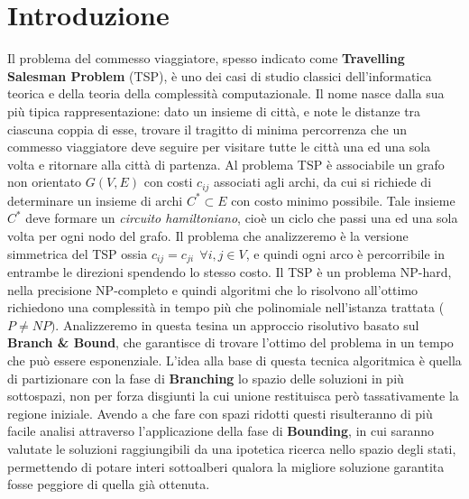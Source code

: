 \documentclass[
	article,			%
	12pt,				%
	oneside,			%
	a4paper,			%
	english,			%
	italian,				%
	sumario=tradicional,
	]{abntex2}
\begin{document}
\section{Introduzione}
Il problema del commesso viaggiatore, spesso indicato come \textbf{Travelling Salesman Problem} (TSP), è uno dei casi di studio classici dell'informatica teorica e della teoria della complessità computazionale. Il nome nasce dalla sua più tipica rappresentazione: dato un insieme di città, e note le distanze tra ciascuna coppia di esse, trovare il tragitto di minima percorrenza che un commesso viaggiatore deve seguire per visitare tutte le città una ed una sola volta e ritornare alla città di partenza. Al problema TSP è associabile un grafo non orientato $G(V,E)$ con costi $c_{ij}$ associati agli archi, da cui si richiede di determinare un insieme di archi $C^* \subset E$ con costo minimo possibile. Tale insieme $C^*$ deve formare un \textit{circuito hamiltoniano}, cioè un ciclo che passi una ed una sola volta per ogni nodo del grafo. Il problema che analizzeremo è la versione simmetrica del TSP ossia $c_{ij} = c_{ji} \:\: \forall i,j \in V$, e quindi ogni arco è percorribile in entrambe le direzioni spendendo lo stesso costo.
\newline
Il TSP è un problema NP-hard, nella precisione NP-completo e quindi algoritmi che lo risolvono all'ottimo richiedono una complessità in tempo più che polinomiale nell'istanza trattata ($P \neq NP)$.
\newline
Analizzeremo in questa tesina un approccio risolutivo basato sul \textbf{Branch \& Bound}, che garantisce di trovare l'ottimo del problema in un tempo che può essere esponenziale. L'idea alla base di questa tecnica algoritmica è quella di partizionare con la fase di \textbf{Branching} lo spazio delle soluzioni in più sottospazi, non per forza disgiunti la cui unione restituisca però tassativamente la regione iniziale. Avendo a che fare con spazi ridotti questi risulteranno di più facile analisi attraverso l'applicazione della fase di \textbf{Bounding}, in cui saranno valutate le soluzioni raggiungibili da una ipotetica ricerca nello spazio degli stati, permettendo di potare interi sottoalberi qualora la migliore soluzione garantita fosse peggiore di quella già ottenuta.

\newpage
\end{document}
